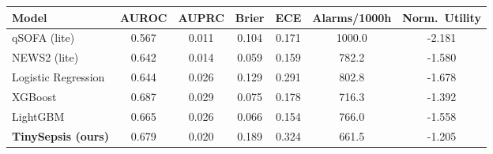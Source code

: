\begin{tabular}{lcccccc}
\toprule
Model & AUROC & AUPRC & Brier & ECE & Alarms/1000h & Norm.\ Utility \\
\midrule
qSOFA (lite) & 0.567 & 0.011 & 0.104 & 0.171 & 1000.0 & -2.181 \\
NEWS2 (lite) & 0.642 & 0.014 & 0.059 & 0.159 & 782.2 & -1.580 \\
Logistic Regression & 0.644 & 0.026 & 0.129 & 0.291 & 802.8 & -1.678 \\
XGBoost & 0.687 & 0.029 & 0.075 & 0.178 & 716.3 & -1.392 \\
LightGBM & 0.665 & 0.026 & 0.066 & 0.154 & 766.0 & -1.558 \\
\textbf{TinySepsis (ours)} & 0.679 & 0.020 & 0.189 & 0.324 & 661.5 & -1.205 \\
\bottomrule
\end{tabular}
